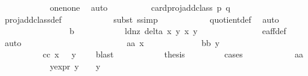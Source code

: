 \begin{isabellebody}
\ \ \ \ \ \ \ \ \ \ \isamarkupfalse%
\ one{\isacharunderscore}none\ \isamarkupfalse%
\ auto\isanewline
\ \ \ \ \ \ \ \ \isamarkupfalse%
\ {\isachardoublequoteopen}card{\isacharparenleft}proj{\isacharunderscore}add{\isacharunderscore}class\ p\ q{\isacharparenright}\ {\isacharequal}\ {}{\isachardoublequoteclose}\isanewline
\ \ \ \ \ \ \ \ \ \ \isamarkupfalse%
\ proj{\isacharunderscore}add{\isacharunderscore}class{\isacharunderscore}def\ {}\isanewline
\ \ \ \ \ \ \ \ \ \ \isamarkupfalse%
{\isacharparenleft}subst\ s{\isacharunderscore}simp{\isacharparenright}\isanewline
\ \ \ \ \ \ \ \ \ \ \isamarkupfalse%
\ quotient{\isacharunderscore}def\ \isamarkupfalse%
\ auto\isanewline
\ \ \ \ \ \ \isamarkupfalse%
\isanewline
\ \ \ \ \ \ \ \ \isamarkupfalse%
\ b\isanewline
\ \ \ \ \ \ \ \ \isamarkupfalse%
\ \isamarkupfalse%
\ ld{\isacharunderscore}nz{\isacharcolon}\ {\isachardoublequoteopen}delta\ x\ y\ x{\isacharprime}\ y{\isacharprime}\ {\isasymnoteq}\ {}{\isachardoublequoteclose}\ \isanewline
\ \ \ \ \ \ \ \ \ \ \isamarkupfalse%
\ e{\isacharunderscore}aff{\isacharunderscore}{}{\isacharunderscore}def\ \isamarkupfalse%
\ auto\ \ \ \ \isanewline
\ \ \ \ \ \ \ \ \isamarkupfalse%
\ \isanewline
\ \ \ \ \ \ \ \ \ \ {\isacharparenleft}aa{\isacharparenright}\ {\isachardoublequoteopen}x{\isacharprime}\ {\isacharequal}\ {}{\isachardoublequoteclose}\ {\isacharbar}\isanewline
\ \ \ \ \ \ \ \ \ \ {\isacharparenleft}bb{\isacharparenright}\ {\isachardoublequoteopen}y{\isacharprime}\ {\isacharequal}\ {}{\isachardoublequoteclose}\ {\isacharbar}\isanewline
\ \ \ \ \ \ \ \ \ \ {\isacharparenleft}cc{\isacharparenright}\ {\isachardoublequoteopen}x{\isacharprime}\ {\isasymnoteq}\ {}{\isachardoublequoteclose}\ {\isachardoublequoteopen}y{\isacharprime}\ {\isasymnoteq}\ {}{\isachardoublequoteclose}\ \isamarkupfalse%
\ blast\isanewline
\ \ \ \ \ \ \ \ \isamarkupfalse%
\ \isamarkupfalse%
\ {\isacharquery}thesis\isanewline
\ \ \ \ \ \ \ \ \isamarkupfalse%
{\isacharparenleft}cases{\isacharparenright}\isanewline
\ \ \ \ \ \ \ \ \ \ \isamarkupfalse%
\ aa\isanewline
\ \ \ \ \ \ \ \ \ \ \isamarkupfalse%
\ y{\isacharunderscore}expr{\isacharcolon}\ {\isachardoublequoteopen}y{\isacharprime}\ {\isacharequal}\ {}\ {\isasymor}\ y{\isacharprime}\ {\isacharequal}\ {\isacharminus}{}{\isachardoublequoteclose}\isanewline

\end{isabellebody}
